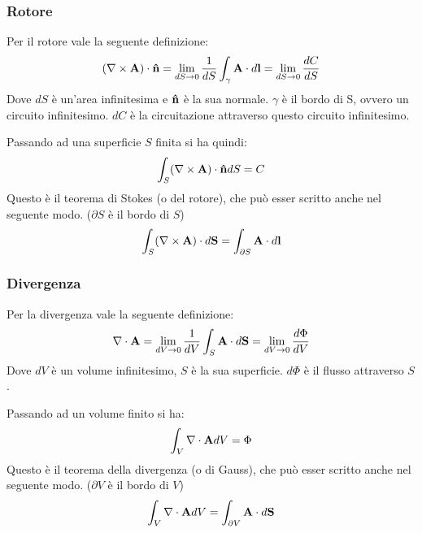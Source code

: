
\subsubsection{Rotore} %
\label{ssub:rotore}

Per il rotore vale la seguente definizione:
\begin{equation} \label{eq:rot_def}
    ( \nabla \times \mathbf A ) \cdot \mathbf{\hat n } 
        = \lim_{ dS \to 0 } \frac{ 1 }{ dS }  \int_\gamma \mathbf A \cdot d \mathbf l 
        = \lim_{ dS \to 0 } \frac{ dC }{ dS }
\end{equation}
Dove $dS$ è un'area infinitesima e $\mathbf{\hat n }$ è la sua normale. $\gamma$ è il bordo di S, ovvero un circuito infinitesimo. $dC$ è la circuitazione attraverso questo circuito infinitesimo.

Passando ad una superficie $S$ finita si ha quindi:
\begin{equation*}
    \int_S ( \nabla \times \mathbf A ) \cdot \mathbf{\hat n } dS = C
\end{equation*}
Questo è il teorema di Stokes (o del rotore), che può esser scritto anche nel seguente modo. ($\partial S$ è il bordo di $S$)
\begin{equation}
    \int_S ( \nabla \times \mathbf A ) \cdot d \mathbf S = \int_{\partial S} \mathbf A \cdot d \mathbf l
\end{equation}



\subsubsection{Divergenza} %
\label{ssub:divergenza}


Per la divergenza vale la seguente definizione:
\begin{equation}    \label{eq:div_def} 
    \nabla \cdot \mathbf A 
        = \lim_{ dV \to 0 } \frac{ 1 }{ dV } \int_S \mathbf A \cdot d \mathbf S 
        = \lim_{ dV \to 0 } \frac{ d\Phi }{ dV }
\end{equation}
Dove $dV$ è un volume infinitesimo, $S$ è la sua superficie. $d\Phi$ è il flusso attraverso $S$.

Passando ad un volume finito si ha:
\begin{equation*}
    \int_V \nabla \cdot \mathbf A dV = \Phi
\end{equation*}
Questo è il teorema della divergenza (o di Gauss), che può esser scritto anche nel seguente modo. ($\partial V$ è il bordo di $V$)
\begin{equation}
    \int_V \nabla \cdot \mathbf A dV = \int_{\partial V} \mathbf A \cdot d \mathbf S
\end{equation}


